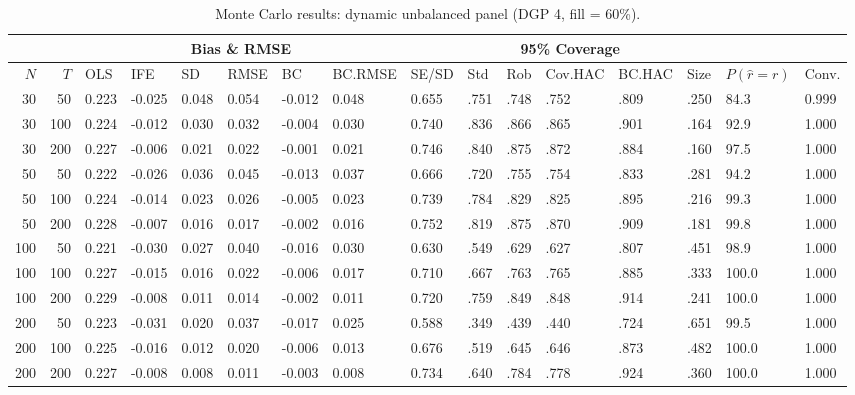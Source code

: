 \begin{table}[ht]
\centering
\caption{Monte Carlo results: dynamic unbalanced panel (DGP 4, fill = 60\%).} 
\label{tab:mc_dyn_unb_f60}
\begin{tabular}{rrllllllllllllll}
  \hline
 & & \multicolumn{6}{c}{Bias \& RMSE} & & \multicolumn{4}{c}{95\% Coverage} & & & \\
\cline{3-8}\cline{10-13}
 \hline
$N$ & $T$ & OLS & IFE & SD & RMSE & BC & BC.RMSE & SE/SD & Std & Rob & Cov.HAC & BC.HAC & Size & $P(\hat r=r)$ & Conv. \\ 
  \hline
30 & 50 & 0.223 & -0.025 & 0.048 & 0.054 & -0.012 & 0.048 & 0.655 & .751 & .748 & .752 & .809 & .250 & 84.3 & 0.999 \\ 
  30 & 100 & 0.224 & -0.012 & 0.030 & 0.032 & -0.004 & 0.030 & 0.740 & .836 & .866 & .865 & .901 & .164 & 92.9 & 1.000 \\ 
  30 & 200 & 0.227 & -0.006 & 0.021 & 0.022 & -0.001 & 0.021 & 0.746 & .840 & .875 & .872 & .884 & .160 & 97.5 & 1.000 \\ 
  50 & 50 & 0.222 & -0.026 & 0.036 & 0.045 & -0.013 & 0.037 & 0.666 & .720 & .755 & .754 & .833 & .281 & 94.2 & 1.000 \\ 
  50 & 100 & 0.224 & -0.014 & 0.023 & 0.026 & -0.005 & 0.023 & 0.739 & .784 & .829 & .825 & .895 & .216 & 99.3 & 1.000 \\ 
  50 & 200 & 0.228 & -0.007 & 0.016 & 0.017 & -0.002 & 0.016 & 0.752 & .819 & .875 & .870 & .909 & .181 & 99.8 & 1.000 \\ 
  100 & 50 & 0.221 & -0.030 & 0.027 & 0.040 & -0.016 & 0.030 & 0.630 & .549 & .629 & .627 & .807 & .451 & 98.9 & 1.000 \\ 
  100 & 100 & 0.227 & -0.015 & 0.016 & 0.022 & -0.006 & 0.017 & 0.710 & .667 & .763 & .765 & .885 & .333 & 100.0 & 1.000 \\ 
  100 & 200 & 0.229 & -0.008 & 0.011 & 0.014 & -0.002 & 0.011 & 0.720 & .759 & .849 & .848 & .914 & .241 & 100.0 & 1.000 \\ 
  200 & 50 & 0.223 & -0.031 & 0.020 & 0.037 & -0.017 & 0.025 & 0.588 & .349 & .439 & .440 & .724 & .651 & 99.5 & 1.000 \\ 
  200 & 100 & 0.225 & -0.016 & 0.012 & 0.020 & -0.006 & 0.013 & 0.676 & .519 & .645 & .646 & .873 & .482 & 100.0 & 1.000 \\ 
  200 & 200 & 0.227 & -0.008 & 0.008 & 0.011 & -0.003 & 0.008 & 0.734 & .640 & .784 & .778 & .924 & .360 & 100.0 & 1.000 \\ 
   \hline
\end{tabular}
\end{table}
